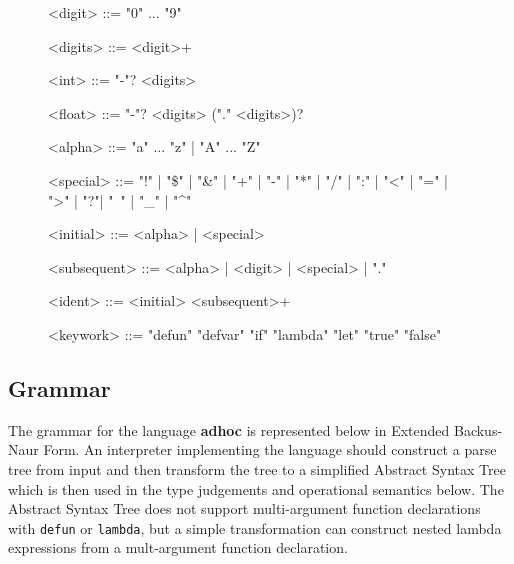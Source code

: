 \documentclass[11pt,a4paper]{article}
\begin{document}

\begin{figure}[H]
\small
\renewcommand{\grammarlabel}[2]{\synt{#1}\hfill#2}
\setlength{\grammarindent}{8em}
\begin{grammar}
<digit> ::= "0" ... "9"

<digits> ::= <digit>+

<int> ::= "-"? <digits>

<float> ::= "-"? <digits> ("." <digits>)?

<alpha> ::= "a" ... "z" | "A" ... "Z"

<special> ::= "!" | "\$" | "\&" | "+" | "-" | "*" | "/" | ":" | "<" | "=" | ">" | "?"| "~" | "_" | "^"

<initial> ::= <alpha> | <special>

<subsequent> ::= <alpha> | <digit> | <special> | "."

<ident> ::= <initial> <subsequent>+

<keywork> ::= "defun"
    \alt "defvar"
    \alt "if"
    \alt "lambda"
    \alt "let"
    \alt "true"
    \alt "false"
\end{grammar}
\end{figure}


\subsection{Grammar}

The grammar for the language \textbf{adhoc} is represented below in
Extended Backus-Naur Form. An interpreter implementing the language should
construct a parse tree from input and then transform the tree to a simplified
Abstract Syntax Tree which is then used in the type judgements and operational
semantics below. The Abstract Syntax Tree does not support multi-argument
function declarations with \verb|defun| or \verb|lambda|, but a simple
transformation can construct nested lambda expressions from a mult-argument
function declaration.

\end{document}
